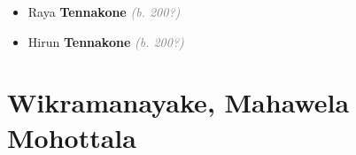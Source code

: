 \documentclass[10pt, openany]{book}
\begin{document}
\begin{itemize}
{\begin{itemize}
{\begin{itemize}
{\begin{itemize}
{\begin{itemize}
{\begin{itemize}
{ }
\item{Raya \textbf{Tennakone} \textcolor{gray}{\textit{(b. 200?)}}
 }
\item{Hirun \textbf{Tennakone} \textcolor{gray}{\textit{(b. 200?)}}
 }
\end{itemize}}
\end{itemize}
 }
\end{itemize}}
\end{itemize}
 }
\end{itemize}}
\end{itemize}
   
\part{Wikramanayake, Mahawela Mohottala}
\end{document}
